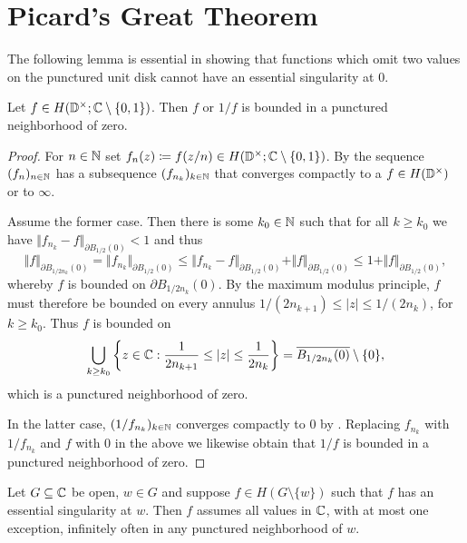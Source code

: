 \section{Picard's Great Theorem}
\label{sec:picards-great-theorem}

The following lemma is essential in showing that functions which omit two values on the punctured unit disk cannot have an essential singularity at $0$.

\begin{lemma} \label{lem:great-picard-bounded}
    Let $f \in H(\mathbb{D}^\times; \mathbb{C} \setminus \{ 0, 1 \})$. Then $f$ or $1/f$ is bounded in a punctured neighborhood of zero.
\end{lemma}

\begin{proof}
    For $n \in \mathbb{N}$ set $f_n(z) \coloneqq f(z / n) \in H(\mathbb{D}^\times; \mathbb{C} \setminus \{ 0, 1 \})$. By  the sequence $(f_n)_{n \in \mathbb{N}}$ has a subsequence $(f_{n_k})_{k \in \mathbb{N}}$ that converges compactly to a $f \in H(\mathbb{D}^\times)$ or to $\infty$.

    Assume the former case. Then there is some $k_0 \in \mathbb{N}$ such that for all $k \geq k_0$ we have $ \Vert f_{n_k} - f \Vert_{\partial B_{1/2}(0)} < 1 $ and thus
    \begin{equation*}
        \Vert f \Vert_{\partial B_{1/2n_k}(0)} = \Vert f_{n_k} \Vert_{\partial B_{1/2}(0)} \leq \Vert f_{n_k} - f \Vert_{\partial B_{1/2}(0)} + \Vert f \Vert_{\partial B_{1/2}(0)} \leq 1 + \Vert f \Vert_{\partial B_{1/2}(0)},
    \end{equation*}
    whereby $f$ is bounded on $\partial B_{1/2n_k}(0)$.
    By the maximum modulus principle, $f$ must therefore be bounded on every annulus $1 / (2 n_{k + 1}) \leq \vert z \vert \leq 1 / (2 n_k)$, for $k \geq k_0$. Thus $f$ is bounded on
    $$ \bigcup_{k \geq k_0} \left\{ z \in \mathbb{C} : \frac{1}{2 n_{k+1}} \leq \vert z \vert \leq \frac{1}{2 n_k} \right\} = \overline{B_{1/2n_k}(0)} \setminus \{ 0 \}, $$
    which is a punctured neighborhood of zero.

    In the latter case, $(1 / f_{n_k})_{k \in \mathbb{N}}$ converges compactly to $0$ by . Replacing $f_{n_k}$ with $1 / f_{n_k}$ and $f$ with $0$ in the above we likewise obtain that $1 / f$ is bounded in a punctured neighborhood of zero.
\end{proof}

\begin{theorem} \label{thm:picards-great-theorem}
    Let $G \subseteq \mathbb{C}$ be open, $w \in G$ and suppose $f \in H(G \setminus \{ w \})$ such that $f$ has an essential singularity at $w$. Then $f$ assumes all values in $\mathbb{C}$, with at most one exception, infinitely often in any punctured neighborhood of $w$.
\end{theorem}

